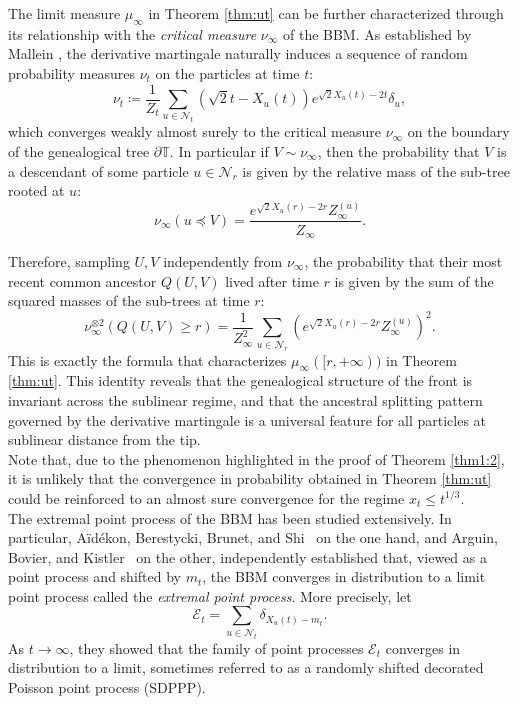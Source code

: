 \documentclass{article}
\begin{document}
The limit measure $\mu_\infty$ in Theorem \ref{thm:ut} can be further characterized through its relationship with the \emph{critical measure} $\nu_\infty$ of the BBM. As established by Mallein \cite{Mallein2018}, the derivative martingale naturally induces a sequence of random probability measures $\nu_t$ on the particles at time $t$:
\begin{equation}
    \nu_t \coloneqq \frac{1}{Z_t} \sum_{u \in \mathcal{N}_t} (\sqrt{2}t - X_u(t)) e^{\sqrt{2}X_u(t) - 2t} \delta_u,
\end{equation}
which converges weakly almost surely to the critical measure $\nu_\infty$ on the boundary of the genealogical tree $\partial \mathbb{T}$. In particular if $V \sim \nu_\infty$, then the probability that $V$ is a descendant of some particle $u \in \mathcal{N}_r$ is given by the relative mass of the sub-tree rooted at $u$:
\begin{equation}
    \nu_\infty(u \preceq V) = \frac{e^{\sqrt{2}X_u(r) - 2r} Z_\infty^{(u)}}{Z_\infty}.
\end{equation}

Therefore, sampling $U,V$ independently from $\nu_\infty$,
the probability that their most recent common ancestor $Q(U, V)$ lived after time $r$ is given by the sum of the squared masses of the sub-trees at time $r$:
\begin{equation}
    \nu_\infty^{\otimes 2}(Q(U,V) \geq r) = \frac{1}{Z_\infty^2} \sum_{u \in \mathcal{N}_r} \left( e^{\sqrt{2}X_u(r) - 2r} Z_\infty^{(u)} \right)^2.
\end{equation}
This is exactly the formula that characterizes $\mu_\infty([r,+\infty))$ in Theorem \ref{thm:ut}. This identity reveals that the genealogical structure of the front is invariant across the sublinear regime, and that the ancestral splitting pattern governed by the derivative martingale is a universal feature for all particles at sublinear distance from the tip.\\


Note that, due to the phenomenon highlighted in the proof of Theorem \ref{thm1:2}, it is unlikely that the convergence in probability obtained in Theorem \ref{thm:ut} could be reinforced to an almost sure convergence for the regime $x_t \leq t^{1/3}$.\\
 
The extremal point process of the BBM has been studied extensively. In particular, Aïdékon, Berestycki, Brunet, and Shi~\cite{adékon2012branching} on the one hand, and Arguin, Bovier, and Kistler~\cite{arguin2011extremal} on the other, independently established that, viewed as a point process and shifted by $m_t$, the BBM converges in distribution to a limit point process called the \emph{extremal point process}. More precisely, let
\begin{equation}
    \mathcal{E}_t = \sum_{u \in \mathcal{N}_t} \delta_{X_u(t) - m_t}.
\end{equation}
As $t \to \infty$, they showed that the family of point processes $\mathcal{E}_t$ converges in distribution to a limit, sometimes referred to as a randomly shifted decorated Poisson point process (SDPPP).
\end{document}
